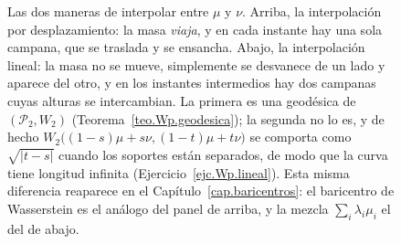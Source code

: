 \documentclass[12pt, a4paper]{amsbook}
\newcommand{\id}{\operatorname{id}}
\theoremstyle{remark}
\theoremstyle{definition}
\numberwithin{section}{chapter}
\numberwithin{subsection}{section}
\numberwithin{equation}{section}
\numberwithin{figure}{chapter}
\begin{document}
\begin{figure}[ht]
\centering
{}
\caption{Las dos maneras de interpolar entre $\mu$ y $\nu$. Arriba, la
interpolación por desplazamiento: la masa \emph{viaja}, y en cada instante hay
una sola campana, que se traslada y se ensancha. Abajo, la interpolación
lineal: la masa no se mueve, simplemente se desvanece de un lado y aparece del
otro, y en los instantes intermedios hay dos campanas cuyas alturas se
intercambian. La primera es una geodésica de $(\mathcal P_2,W_2)$
(Teorema~\ref{teo.Wp.geodesica}); la segunda no lo es, y de hecho
$W_2\bigl((1-s)\mu+s\nu,(1-t)\mu+t\nu\bigr)$ se comporta como
$\sqrt{|t-s|}$ cuando los soportes están separados, de modo que la curva tiene
longitud infinita (Ejercicio~\ref{ejc.Wp.lineal}). Esta misma diferencia
reaparece en el Capítulo~\ref{cap.baricentros}: el baricentro de Wasserstein
es el análogo del panel de arriba, y la mezcla $\sum_i\lambda_i\mu_i$ el del
de abajo.}
\label{fig.desplazamiento.mezcla}
\end{figure}
\end{document}
